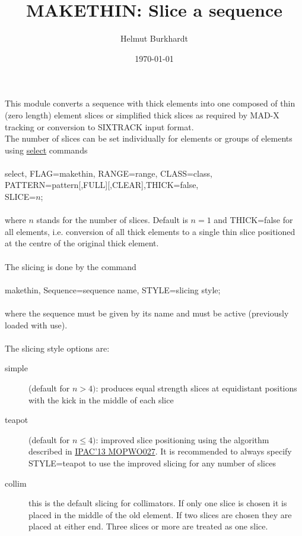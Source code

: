 \documentclass{article}    %
\title{{\color{red} MAKETHIN: Slice a sequence}}
\author{ Helmut Burkhardt }
\date{\today}
\begin{document}

\maketitle                 %

\noindent
This module converts a sequence with thick elements into one composed of thin (zero length) element slices or simplified thick slices as required by MAD-X tracking or conversion to SIXTRACK input format. \\

\noindent
The number of slices can be set individually for elements or groups of elements using \href{http://mad.web.cern.ch/mad/madx.old/Introduction/select.html}{select} commands \\ \\
\textsf{\color{darkgreen}select, FLAG=makethin, RANGE=range, CLASS=class, PATTERN=pattern[,FULL][,CLEAR],THICK=false,}\\
\textsf{\color{darkgreen} SLICE=$n$;}\\ \\
where $n$ stands for the number of slices. Default is $n=1$ and THICK=false for all elements, i.e. conversion of all thick elements to a single thin slice positioned at the centre of the original thick element.\\ \\

\noindent
The slicing is done by the command\\ \\
\textsf{\color{darkgreen}makethin, Sequence=sequence name, STYLE=slicing style;}\\ \\
where the sequence must be given by its name and must be active (previously loaded with use).\\ \\
The \textsf{\color{darkgreen}slicing style} options are:
\begin{description}
  \item[\textsf{\color{darkgreen}simple}] (default for $n>4)$: produces equal strength slices at equidistant positions with the kick in the middle of each slice
  \item[\textsf{\color{darkgreen}teapot}] (default for $n\leq 4)$: improved slice positioning using the algorithm described in \href{http://accelconf.web.cern.ch/AccelConf/IPAC2013/papers/mopwo027.pdf}{IPAC'13 MOPWO027}. It is recommended to always specify \textsf{\color{darkgreen}STYLE=teapot} 
  to use the improved slicing for any number of slices
    \item[\textsf{\color{darkgreen}collim}] this is the default slicing for collimators. If only one slice is chosen it is placed in the middle of the old element. If two slices are chosen they are placed at either end. Three slices or more are treated as one slice.
\end{description}
\end{document}
